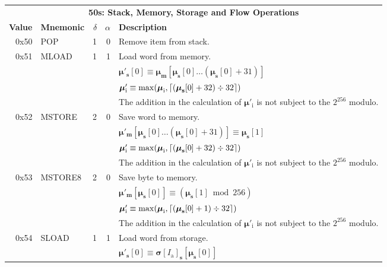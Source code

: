 \documentclass[9pt,oneside]{amsart}
\DeclarePairedDelimiter{\ceil}{\lceil}{\rceil}
\begin{document}
\begin{tabular*}{\columnwidth}[h]{rlrrl}
\toprule
\multicolumn{5}{c}{\textbf{50s: Stack, Memory, Storage and Flow Operations}} \vspace{5pt} \\
\textbf{Value} & \textbf{Mnemonic} & $\delta$ & $\alpha$ & \textbf{Description} \vspace{5pt} \\
0x50 & {\small POP} & 1 & 0 & Remove item from stack. \\
\midrule
0x51 & {\small MLOAD} & 1 & 1 & Load word from memory. \\
&&&& $\boldsymbol{\mu}'_{\mathbf{s}}[0] \equiv \boldsymbol{\mu}_{\mathbf{m}}[\boldsymbol{\mu}_{\mathbf{s}}[0] \dots (\boldsymbol{\mu}_{\mathbf{s}}[0] + 31) ]$ \\
&&&& $\boldsymbol{\mu}'_{\mathrm{i}} \equiv \max(\boldsymbol{\mu}_{\mathrm{i}}, \ceil{ (\boldsymbol{\mu}_{\mathbf{s}}[0] + 32) \div 32 })$ \\
&&&& The addition in the calculation of $\boldsymbol{\mu}'_{\mathrm{i}}$ is not subject to the $2^{256}$ modulo. \\
\midrule
0x52 & {\small MSTORE} & 2 & 0 & Save word to memory. \\
&&&& $\boldsymbol{\mu}'_{\mathbf{m}}[ \boldsymbol{\mu}_{\mathbf{s}}[0] \dots (\boldsymbol{\mu}_{\mathbf{s}}[0] + 31) ] \equiv \boldsymbol{\mu}_{\mathbf{s}}[1]$ \\
&&&& $\boldsymbol{\mu}'_{\mathrm{i}} \equiv \max(\boldsymbol{\mu}_{\mathrm{i}}, \ceil{ (\boldsymbol{\mu}_{\mathbf{s}}[0] + 32) \div 32 })$ \\
&&&& The addition in the calculation of $\boldsymbol{\mu}'_{\mathrm{i}}$ is not subject to the $2^{256}$ modulo. \\
\midrule
0x53 & {\small MSTORE8} & 2 & 0 & Save byte to memory. \\
&&&& $\boldsymbol{\mu}'_{\mathbf{m}}[ \boldsymbol{\mu}_{\mathbf{s}}[0] ] \equiv (\boldsymbol{\mu}_{\mathbf{s}}[1] \bmod 256) $ \\
&&&& $\boldsymbol{\mu}'_{\mathrm{i}} \equiv \max(\boldsymbol{\mu}_{\mathrm{i}}, \ceil{ (\boldsymbol{\mu}_{\mathbf{s}}[0] + 1) \div 32 })$ \\
&&&& The addition in the calculation of $\boldsymbol{\mu}'_{\mathrm{i}}$ is not subject to the $2^{256}$ modulo. \\
\midrule
0x54 & {\small SLOAD} & 1 & 1 & Load word from storage. \\
&&&& $\boldsymbol{\mu}'_{\mathbf{s}}[0] \equiv \boldsymbol{\sigma}[I_{\mathrm{a}}]_{\mathbf{s}}[\boldsymbol{\mu}_{\mathbf{s}}[0]]$ \\

\end{tabular*}
\end{document}
